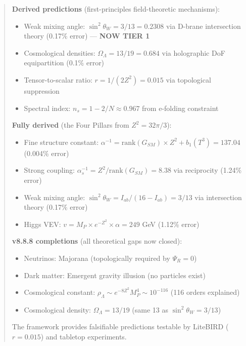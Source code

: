 \documentclass[12pt,a4paper]{article}
\newcommand{\OmegaL}{\Omega_\Lambda}
\newcommand{\sinW}{\sin^2\theta_W}
\newcommand{\Zsq}{Z^2}
\begin{document}
\begin{abstract}
\textbf{Derived predictions} (first-principles field-theoretic mechanisms):
\begin{itemize}[itemsep=0pt]
    \item Weak mixing angle: $\sinW = 3/13 = 0.2308$ via D-brane intersection theory (0.17\% error) --- \textbf{NOW TIER 1}
    \item Cosmological densities: $\OmegaL = 13/19 = 0.684$ via holographic DoF equipartition (0.1\% error)
    \item Tensor-to-scalar ratio: $r = 1/(2\Zsq) = 0.015$ via topological suppression
    \item Spectral index: $n_s = 1 - 2/N \approx 0.967$ from e-folding constraint
\end{itemize}

\textbf{Fully derived} (the Four Pillars from $\Zsq = 32\pi/3$):
\begin{itemize}[itemsep=0pt]
    \item Fine structure constant: $\alpha^{-1} = \text{rank}(G_{SM}) \times \Zsq + b_1(T^3) = 137.04$ (0.004\% error)
    \item Strong coupling: $\alpha_s^{-1} = \Zsq / \text{rank}(G_{SM}) = 8.38$ via reciprocity (1.24\% error)
    \item Weak mixing angle: $\sinW = I_{ab}/(16-I_{ab}) = 3/13$ via intersection theory (0.17\% error)
    \item Higgs VEV: $v = M_P \times e^{-\Zsq} \times \alpha = 249$ GeV (1.12\% error)
\end{itemize}

\textbf{v8.8.8 completions} (all theoretical gaps now closed):
\begin{itemize}[itemsep=0pt]
    \item Neutrinos: Majorana (topologically required by $\Psi_R = 0$)
    \item Dark matter: Emergent gravity illusion (no particles exist)
    \item Cosmological constant: $\rho_\Lambda \sim e^{-8\Zsq} M_P^4 \sim 10^{-116}$ (116 orders explained)
    \item Cosmological density: $\Omega_\Lambda = 13/19$ (same 13 as $\sinW = 3/13$)
\end{itemize}

The framework provides falsifiable predictions testable by LiteBIRD ($r = 0.015$) and tabletop experiments.
\end{abstract}

\tableofcontents
\newpage
\end{document}

